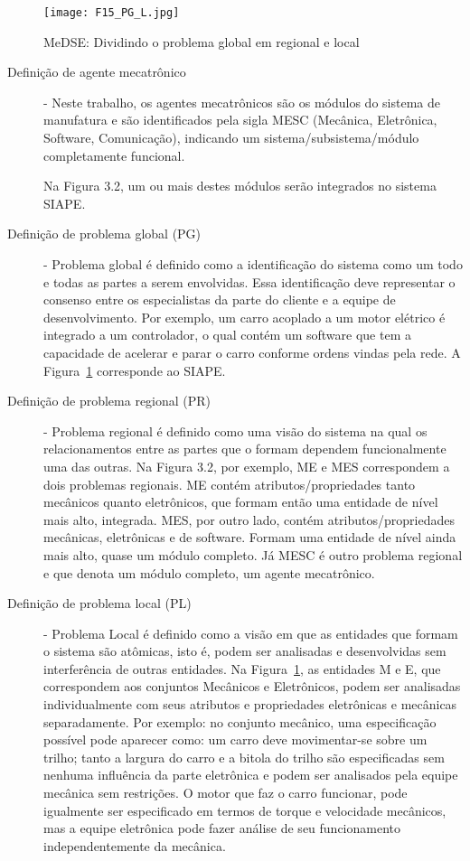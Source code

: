 \begin{figure}
	\centering
	\texttt{[image: F15\_PG\_L.jpg]} 
	\caption{MeDSE: Dividindo o problema global em regional e local}
	\label{F15}
\end{figure}

\begin{description}
	
\item[Definição de agente mecatrônico] - Neste trabalho, os agentes mecatrônicos são os módulos do sistema de manufatura e são identificados pela sigla MESC (Mecânica, Eletrônica, Software, Comunicação), indicando um sistema/subsistema/módulo completamente funcional.

Na Figura 3.2, um ou mais destes módulos serão integrados no sistema SIAPE.

\item[Definição de problema global (PG)] - Problema global é definido como a identificação do sistema como um todo e todas as partes a serem envolvidas. Essa identificação deve representar o consenso entre os especialistas da parte do cliente e a equipe de desenvolvimento. Por exemplo, um carro acoplado a um motor elétrico é integrado a um controlador, o qual contém um software que tem a capacidade de acelerar e parar o carro conforme ordens vindas pela rede. A Figura~\ref{F15} corresponde ao SIAPE.


\item[Definição de problema regional (PR)] - Problema regional é definido como uma visão do sistema na qual os relacionamentos entre as partes que o formam dependem funcionalmente uma das outras. Na Figura 3.2, por exemplo, ME e MES correspondem a dois problemas regionais. ME contém atributos/propriedades tanto mecânicos quanto eletrônicos, que formam então uma entidade de nível mais alto, integrada. MES, por outro lado, contém atributos/propriedades mecânicas, eletrônicas e de software. Formam uma entidade de nível ainda mais alto, quase um módulo completo.
Já MESC é outro problema regional e que denota um módulo completo, um agente mecatrônico.

\item[Definição de problema local (PL)] - Problema Local é definido como a visão em que as entidades que formam o sistema são atômicas, isto é, podem ser analisadas e desenvolvidas sem interferência de outras entidades. Na Figura~\ref{F15}, as entidades M e E, que correspondem aos conjuntos Mecânicos e Eletrônicos, podem ser analisadas individualmente com seus atributos e propriedades eletrônicas e mecânicas separadamente. Por exemplo: no conjunto mecânico, uma especificação possível pode aparecer como: um carro deve movimentar-se sobre um trilho; tanto a largura do carro e a bitola do trilho são especificadas sem nenhuma influência da parte eletrônica e podem ser analisados pela equipe mecânica sem restrições. O motor que faz o carro funcionar, pode igualmente ser especificado em termos de torque e velocidade mecânicos, mas a equipe eletrônica pode fazer análise de seu funcionamento independentemente da mecânica.\par 


\end{description}
